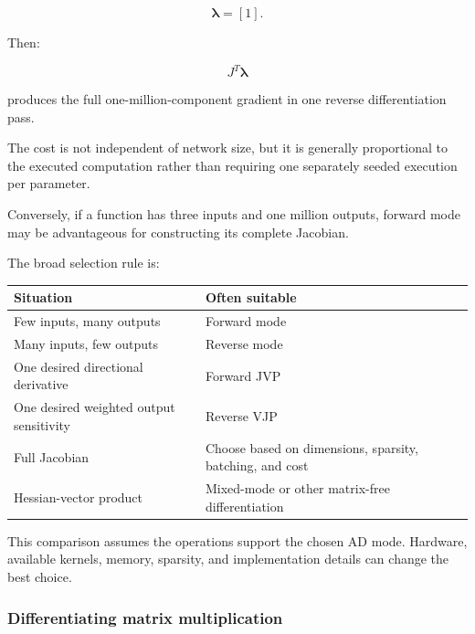 \[
\boldsymbol\lambda=[1].
\]

Then:

\[
J^T\boldsymbol\lambda
\]

produces the full one-million-component gradient in one reverse differentiation pass.

The cost is not independent of network size, but it is generally proportional to the executed computation rather than requiring one separately seeded execution per parameter.

Conversely, if a function has three inputs and one million outputs, forward mode may be advantageous for constructing its complete Jacobian.

The broad selection rule is:

{\def\LTcaptype{none} %
\begin{longtable}[]{@{}
  >{\raggedright\arraybackslash}p{}
  >{\raggedright\arraybackslash}p{}@{}}
\toprule\noalign{}
\begin{minipage}[b]{\linewidth}\raggedright
Situation
\end{minipage} & \begin{minipage}[b]{\linewidth}\raggedright
Often suitable
\end{minipage} \\
\midrule\noalign{}
\endhead
\bottomrule\noalign{}
\endlastfoot
Few inputs, many outputs & Forward mode \\
Many inputs, few outputs & Reverse mode \\
One desired directional derivative & Forward JVP \\
One desired weighted output sensitivity & Reverse VJP \\
Full Jacobian & Choose based on dimensions, sparsity, batching, and cost \\
Hessian-vector product & Mixed-mode or other matrix-free differentiation \\
\end{longtable}
}

This comparison assumes the operations support the chosen AD mode. Hardware, available kernels, memory, sparsity, and implementation details can change the best choice.

\subsubsection{Differentiating matrix multiplication}\label{02-foundations-ii-ch022-differentiating-matrix-multiplication}

